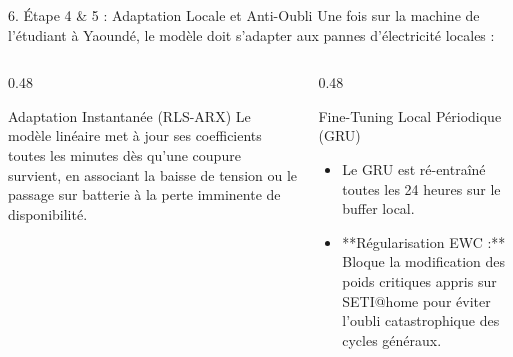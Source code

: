 \documentclass[10pt,aspectratio=169]{beamer}
\begin{document}
\begin{frame}{6. Étape 4 \& 5 : Adaptation Locale et Anti-Oubli}
  Une fois sur la machine de l'étudiant à Yaoundé, le modèle doit s'adapter aux pannes d'électricité locales :
  
  \vspace{0.5em}
  \begin{columns}[T]
    \begin{column}{0.48\textwidth}
      \begin{block}{Adaptation Instantanée (RLS-ARX)}
        Le modèle linéaire met à jour ses coefficients toutes les minutes dès qu'une coupure survient, en associant la baisse de tension ou le passage sur batterie à la perte imminente de disponibilité.
      \end{block}
    \end{column}
    
    \begin{column}{0.48\textwidth}
      \begin{block}{Fine-Tuning Local Périodique (GRU)}
        \begin{itemize}
          \item Le GRU est ré-entraîné toutes les 24 heures sur le buffer local.
          \item **Régularisation EWC :** Bloque la modification des poids critiques appris sur SETI@home pour éviter l'oubli catastrophique des cycles généraux.
        \end{itemize}
      \end{block}
    \end{column}
  \end{columns}
\end{frame}
\end{document}
